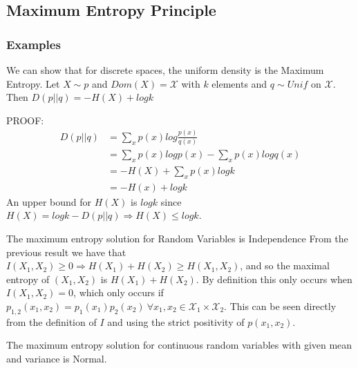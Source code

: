 \documentclass[]{article}
\theoremstyle{mattstyle}
\theoremstyle{definition}
\begin{document}
\subsection{Maximum Entropy Principle}


\subsubsection{Examples}
We can show that for discrete spaces, the uniform density is the Maximum Entropy.
Let \(X \sim p\) and $Dom(X) = \mathcal{X}$ with $k$ elements and \(q\sim Unif\) on $\mathcal{X}$. Then \(D(p||q) = -H(X) + logk\)

PROOF: 
\begin{align*}
D(p||q)&=\sum_{x}p(x)log\frac{p(x)}{q(x)}\\
&=\sum_{x}p(x)logp(x)-\sum_xp(x)logq(x)\\
&= -H(X) + \sum_xp(x)logk \\
&= -H(x) + logk
\end{align*}
An upper bound for \(H(X)\) is \(logk\) since \(H(X)=logk-D(p||q) \Rightarrow H(X) \le logk \).

The maximum entropy solution for Random Variables is Independence
From the previous result we have that \(I(X_1,X_2)\ge0 \Rightarrow H(X_1) + H(X_2) \ge H(X_1,X_2) \), and so the maximal entropy of \((X_1,X_2)\) is \(H(X_1) + H(X_2)\). By definition this only occurs when \(I(X_1,X_2)=0\), which only occurs if
\(p_{1,2}(x_1,x_2)=p_1(x_1)p_2(x_2) \ \forall x_1,x_2 \in \mathcal{X}_1\times\mathcal{X}_2\). This can be seen directly from the definition of \(I\) and using the strict positivity of \(p(x_1,x_2)\).

The maximum entropy solution for continuous random variables with given mean and variance is Normal.

\newpage



\end{document}
